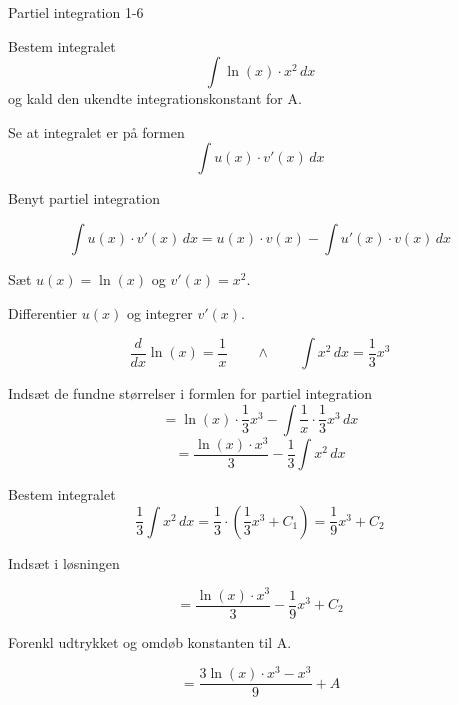 \documentclass{article}
\begin{document}
\begin{exercise}{Partiel integration 1-6}
	
	
	Bestem integralet
	\[
	\int \ln(x) \cdot x^2 \, dx
	\]
	og kald den ukendte integrationskonstant for A.
	
	
	
	\hint
	
	Se at integralet er på formen
	\[
	\int u(x) \cdot v'(x) \, dx
	\]
	
	\hint
	
	Benyt partiel integration
	
	\hint
	\[
	\int u(x) \cdot v'(x)\, dx = u(x) \cdot v(x) - \int u'(x) \cdot v(x) \, dx
	\]
	\hint
	
	Sæt $u(x) = \ln(x)$ og $v'(x) = x^2$.
	
	
	\hint
	
	Differentier $u(x)$ og integrer $v'(x)$.
	
	\hint
	\[
	\frac{d}{dx}\ln(x)= \frac{1}{x} \qquad \wedge \qquad \int x^2 \, dx = \frac{1}{3}x^3
	\]
	
	\hint
	
	Indsæt de fundne størrelser i formlen for partiel integration
	\[
	= \ln(x) \cdot \frac{1}{3}x^3 - \int \frac{1}{x} \cdot \frac{1}{3}x^3 \, dx
	\]
	\[
	= \frac{\ln(x) \cdot x^3}{3} - \frac{1}{3} \int x^2 \, dx
	\]
	
	\hint
	
	Bestem integralet
	\[
	\frac{1}{3} \int x^2 \, dx = \frac{1}{3} \cdot \left( \frac{1}{3}x^3 + C_1 \right)= \frac{1}{9}x^3 + C_2
	\]
	
	\hint
	Indsæt i løsningen 
	
	\hint
	
	\[
	= \frac{\ln(x) \cdot x^3}{3} - \frac{1}{9}x^3 + C_2
	\]
	
	\hint
	
	Forenkl udtrykket og omdøb konstanten til A.
	
	\hint
	
	\[
	= \frac{3\ln(x) \cdot x^3 - x^3}{9}  + A
	\]
	
	
\end{exercise}

\newpage
\end{document}
